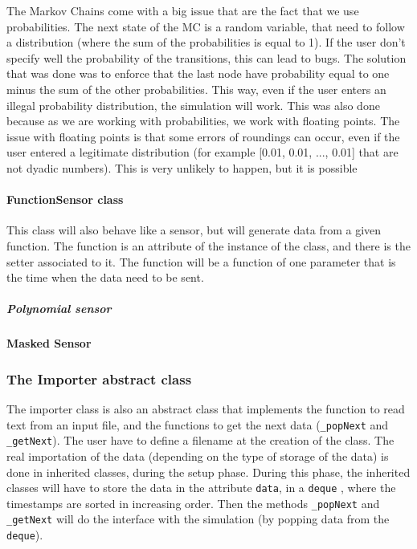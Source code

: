 The Markov Chains come with a big issue that are the fact that we use probabilities. The next state of the MC is a random variable, that need to follow a distribution (where the sum of the probabilities is equal to 1). If the user don't specify well the probability of the transitions, this can lead to bugs. The solution that was done was to enforce that the last node have probability equal to one minus the sum of the other probabilities. This way, even if the user enters an illegal probability distribution, the simulation will work.
This was also done because as we are working with probabilities, we work with floating points. The issue with floating points is that some errors of roundings can occur, even if the user entered a legitimate distribution (for example [0.01, 0.01, ..., 0.01] that are not dyadic numbers). This is very unlikely to happen, but it is possible

\paragraph{FunctionSensor class}

This class will also behave like a sensor, but will generate data from a given function. The function is an attribute of the instance of the class, and there is the setter associated to it.
The function will be a function of one parameter that is the time when the data need to be sent.

\subparagraph{Polynomial sensor}


\paragraph{Masked Sensor}




\subsubsection{The Importer abstract class}

The importer class is also an abstract class that implements the function to read text from an input file, and the functions to get the next data (\verb!_popNext! and \verb!_getNext!). The user have to define a filename at the creation of the class. The real importation of the data (depending on the type of storage of the data) is done in inherited classes, during the setup phase. During this phase, the inherited classes will have to store the data in the attribute \verb!data!, in a \verb!deque! , where the timestamps are sorted in increasing order. Then the methods \verb!_popNext! and \verb!_getNext! will do the interface with the simulation (by popping data from the \verb!deque!).

